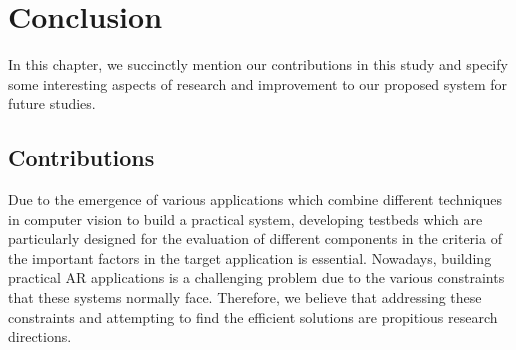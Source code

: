 \chapter{Conclusion}
\label{chap:Conclusion}
In this chapter, we succinctly mention our contributions in this study and specify some interesting aspects of research and improvement to our proposed system 
for future studies.

\section{Contributions}
Due to the emergence of various applications which combine different techniques in computer vision 
to build a practical system, developing testbeds which are particularly designed for the evaluation of different components in the criteria of the important factors
in the target application is essential.
Nowadays, building practical AR applications is a challenging problem due to the various constraints that these systems normally face. Therefore, we believe that
addressing these constraints and attempting to find the efficient solutions are propitious research directions.

